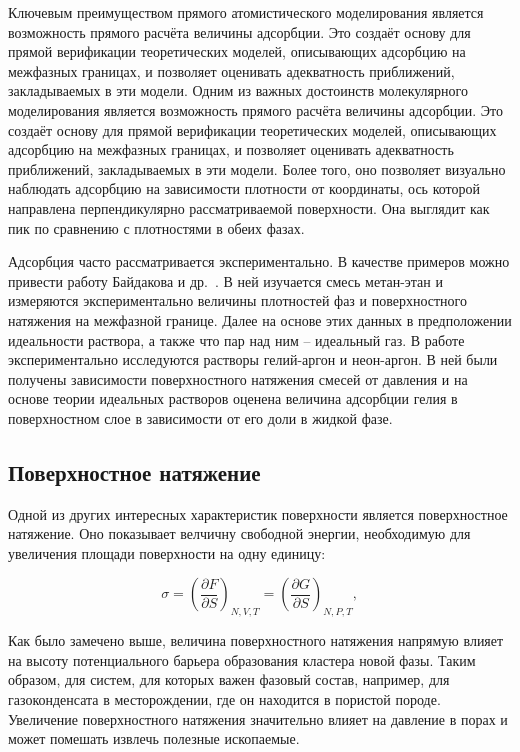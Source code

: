 Ключевым преимуществом прямого атомистического моделирования является возможность прямого расчёта величины адсорбции. Это создаёт основу для прямой верификации теоретических моделей, описывающих адсорбцию на межфазных границах, и позволяет оценивать адекватность приближений, закладываемых в эти модели.
Одним из важных достоинств молекулярного моделирования является возможность прямого расчёта величины адсорбции. Это создаёт основу для прямой верификации теоретических моделей, описывающих адсорбцию на межфазных границах, и позволяет оценивать адекватность приближений, закладываемых в эти модели. Более того, оно позволяет визуально наблюдать адсорбцию на зависимости плотности от координаты, ось которой направлена перпендикулярно рассматриваемой поверхности. Она выглядит как пик по сравнению с плотностями в обеих фазах. 

Адсорбция часто рассматривается экспериментально. В качестве примеров можно привести работу Байдакова и др.~\cite{baidakov_surface_2013}. В ней изучается смесь метан-этан и измеряются экспериментально величины плотностей фаз и поверхностного натяжения на межфазной границе. Далее на основе этих данных в предположении идеальности раствора, а также что пар над ним \--- идеальный газ. В работе~\cite{baidakov_Ar_2006} экспериментально исследуются растворы гелий-аргон и неон-аргон. В ней были получены зависимости поверхностного натяжения смесей от давления и на основе теории идеальных растворов оценена величина адсорбции гелия в поверхностном слое в зависимости от его доли в жидкой фазе. 


\subsection{Поверхностное натяжение}

Одной из других интересных характеристик поверхности является поверхностное натяжение. Оно показывает велчичну свободной энергии, необходимую для увеличения площади поверхности на одну единицу:

\begin{equation}
    \sigma = (\frac{\partial F}{\partial S})_{N, V, T} = (\frac{\partial G}{\partial S})_{N, P, T},
\end{equation}

Как было замечено выше, величина поверхностного натяжения напрямую влияет на высоту потенциального барьера образования кластера новой фазы. Таким образом, для систем, для которых важен фазовый состав, например, для газоконденсата в месторождении, где он находится в пористой породе. Увеличение поверхностного натяжения значительно влияет на давление в порах и может помешать извлечь полезные ископаемые.  

